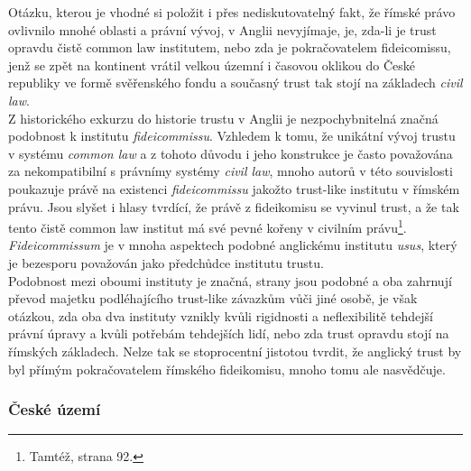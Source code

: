 \documentclass{article}
\begin{document}
Otázku, kterou je vhodné si položit i přes nediskutovatelný fakt, že římské právo ovlivnilo mnohé oblasti a právní vývoj, v Anglii nevyjímaje, je, zda-li je trust opravdu čistě common law institutem, nebo zda je pokračovatelem fideicomissu, jenž se zpět na kontinent vrátil velkou územní i časovou oklikou do České republiky ve formě svěřenského fondu a současný trust tak stojí na základech \textit{civil law}.\\

Z historického exkurzu do historie trustu v Anglii je nezpochybnitelná značná podobnost k institutu \textit{fideicommissu}. Vzhledem k tomu, že unikátní vývoj trustu v systému \textit{common law} a z tohoto důvodu i jeho konstrukce je často považována za nekompatibilní s právnímy systémy \textit{civil law}, mnoho autorů v této souvislosti poukazuje právě na existenci \textit{fideicommissu} jakožto trust-like institutu v římském právu. Jsou slyšet i hlasy tvrdící, že právě z fideikomisu se vyvinul trust, a že tak tento čistě common law institut má své pevné kořeny v civilním právu\footnote{Tamtéž, strana 92.}. \textit{Fideicommissum} je v mnoha aspektech podobné anglickému institutu \textit{usus}, který je bezesporu považován jako předchůdce institutu trustu.\\

Podobnost mezi oboumi instituty je značná, strany jsou podobné a oba zahrnují převod majetku podléhajícího trust-like závazkům vůči jiné osobě, je však otázkou, zda oba dva instituty vznikly kvůli rigidnosti a neflexibilitě tehdejší právní úpravy a kvůli potřebám tehdejších lidí, nebo zda trust opravdu stojí na římských základech. Nelze tak se stoprocentní jistotou tvrdit, že anglický trust by byl přímým pokračovatelem římského fideikomisu, mnoho tomu ale nasvědčuje.


\subsubsection{České území}
\end{document}
